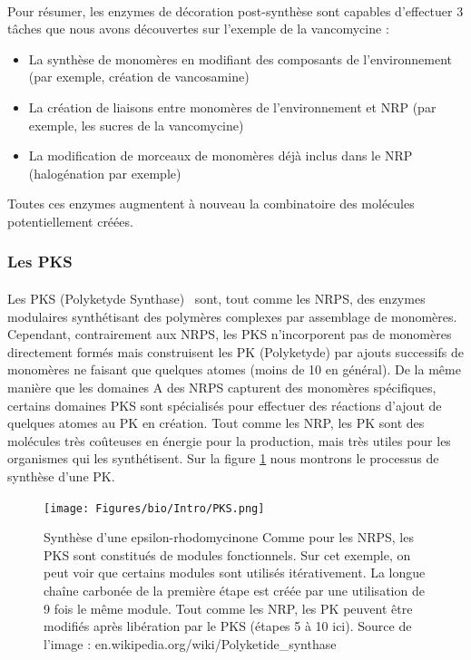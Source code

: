 \documentclass[12pt,french,twoside]{report}
\begin{document}
\paragraph{}Pour résumer, les enzymes de décoration post-synthèse sont capables d'effectuer 3 tâches que nous avons découvertes sur l'exemple de la vancomycine :
\begin{itemize}
  \item La synthèse de monomères en modifiant des composants de l'environnement (par exemple, création de vancosamine)
  \item La création de liaisons entre monomères de l'environnement et NRP (par exemple, les sucres de la vancomycine)
  \item La modification de morceaux de monomères déjà inclus dans le NRP (halogénation par exemple)
\end{itemize}

Toutes ces enzymes augmentent à nouveau la combinatoire des molécules potentiellement créées.



\subsubsection{Les PKS}

\paragraph{}Les PKS (Polyketyde Synthase)~\cite{shen_polyketide_2003,staunton_polyketide_2001} sont, tout comme les NRPS, des enzymes modulaires synthétisant des polymères complexes par assemblage de monomères.
Cependant, contrairement aux NRPS, les PKS n'incorporent pas de monomères directement formés mais construisent les PK (Polyketyde) par ajouts successifs de monomères ne faisant que quelques atomes (moins de 10 en général).
De la même manière que les domaines A des NRPS capturent des monomères spécifiques, certains domaines PKS sont spécialisés pour effectuer des réactions d'ajout de quelques atomes au PK en création.
Tout comme les NRP, les PK sont des molécules très coûteuses en énergie pour la production, mais très utiles pour les organismes qui les synthétisent.
Sur la figure \ref{pks} nous montrons le processus de synthèse d'une PK.

\begin{figure}
  \begin{center}
    \texttt{[image: Figures/bio/Intro/PKS.png]}
    \caption{\label{pks}Synthèse d'une epsilon-rhodomycinone
    Comme pour les NRPS, les PKS sont constitués de modules fonctionnels.
    Sur cet exemple, on peut voir que certains modules sont utilisés itérativement.
    La longue chaîne carbonée de la première étape est créée par une utilisation de 9 fois le même module.
    Tout comme les NRP, les PK peuvent être modifiés après libération par le PKS (étapes 5 à 10 ici).
    Source de l'image : en.wikipedia.org/wiki/Polyketide\_synthase}
  \end{center}
\end{figure}
\end{document}

